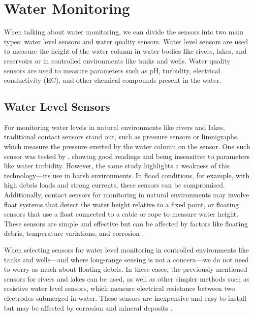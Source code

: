 \documentclass[conference]{IEEEtran}
\begin{document}
\section{Water Monitoring} \label{sec:water_monitoring}

When talking about water monitoring, we can divide the sensors into two main types: water level sensors and water quality sensors. Water level sensors are used to measure the height of the water column in water bodies like rivers, lakes, and reservoirs or in controlled environments like tanks and wells. Water quality sensors are used to measure parameters such as pH, turbidity, electrical conductivity (EC), and other chemical compounds present in the water.
\subsection{Water Level Sensors} \label{subsec:water_level_sensors}

For monitoring water levels in natural environments like rivers and lakes, traditional contact sensors stand out, such as pressure sensors or limnigraphs, which measure the pressure exerted by the water column on the sensor. One such sensor was tested by \cite{santana_2024_development}, showing good readings and being insensitive to parameters like water turbidity. However, the same study highlights a weakness of this technology---its use in harsh environments. In flood conditions, for example, with high debris loads and strong currents, these sensors can be compromised. Additionally, contact sensors for monitoring in natural environments may involve float systems that detect the water height relative to a fixed point, or floating sensors that use a float connected to a cable or rope to measure water height. These sensors are simple and effective but can be affected by factors like floating debris, temperature variations, and corrosion \cite{mohammadrezamasoudimoghaddam_2024_a,santana_2024_development, paul_2020_a, yukawa_2025_an}.

When selecting sensors for water level monitoring in controlled environments like tanks and wells—and where long-range sensing is not a concern—we do not need to worry as much about floating debris. In these cases, the previously mentioned sensors for rivers and lakes can be used, as well as other simpler methods such as resistive water level sensors, which measure electrical resistance between two electrodes submerged in water. These sensors are inexpensive and easy to install but may be affected by corrosion and mineral deposits \cite{santana_2024_development, mohindru_2023_development}.
\end{document}
